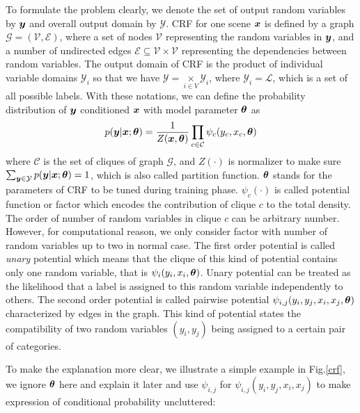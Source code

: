 To formulate the problem clearly, we denote the set of output random variables by $\boldsymbol y$ and overall output domain by $\mathcal{Y}$. CRF for one scene $\boldsymbol x$ is defined by a graph $\mathcal{G} = (\mathcal{V}, \mathcal{E})$, where a set of nodes $\mathcal{V}$ representing the random variables in $\boldsymbol y$, and a number of undirected edges $\mathcal{E}\subseteq\mathcal{V}\times\mathcal{V}$ representing the dependencies between random variables. The output domain of CRF is the product of individual variable domains $\mathcal{Y}_i$ so that we have $\mathcal{Y} = \underset{i\in V}{\times} \mathcal{Y}_i$, where $\mathcal{Y}_i = \mathcal{L}$, which is a set of all possible labels. With these notations, we can define the probability distribution of $\boldsymbol y$ conditioned $\boldsymbol x$ with model parameter $\boldsymbol \theta$ as 
\begin{equation}
\label{crf}
\begin{aligned}
p(\boldsymbol y|\boldsymbol x; \boldsymbol \theta) = \frac{1}{Z(\boldsymbol x, \boldsymbol \theta)}\prod_{c\in\mathcal{C}}\psi_{c}(y_c, x_c, \boldsymbol \theta)
\end{aligned}
\end{equation}
where $\mathcal{C}$ is the set of cliques of graph $\mathcal{G}$, and $Z(\cdot)$ is normalizer to make sure $\sum_{\boldsymbol y \in \mathcal{Y}}p(\boldsymbol y | \boldsymbol x; \boldsymbol \theta) = 1$, which is also called partition function. $\boldsymbol \theta$ stands for the parameters of CRF to be tuned during training phase. $\psi_c(\cdot)$ is called potential function or factor which encodes the contribution of clique $c$ to the total density. The order of number of random variables in clique $c$ can be arbitrary number. However, for computational reason, we only consider factor with number of random variables up to two in normal case. The first order potential is called \textit{unary} potential which means that the clique of this kind of potential contains only one random variable, that is $\psi_i(y_i, x_i, \boldsymbol \theta)$. Unary potential can be treated as the likelihood that a label is assigned to this random variable independently to others. The second order potential is called pairwise potential $\psi_{i,j}(y_i,y_j, x_i, x_j, \boldsymbol \theta)$ characterized by edges in the graph. This kind of potential states the compatibility of two random variables $(y_i,y_j)$ being assigned to a certain pair of categories. 

To make the explanation more clear, we illustrate a simple example in Fig.\ref{crf}, we ignore $\boldsymbol \theta$ here and explain it later and use $\psi_{i,j}$ for $\psi_{i,j}(y_i,y_j,x_i,x_j)$ to make expression of conditional probability uncluttered:

